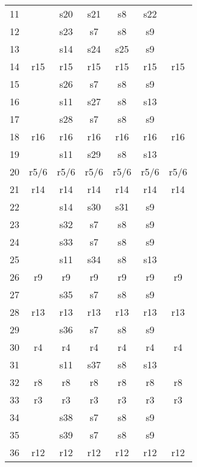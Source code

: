 \begin{figure}
\begin{minipage}{55mm}
\begin{tabular}{r@{\hspace{.6em}}c@{\hspace{.6em}}c*{4}{@{\hspace{1.2em}}c}}
        11 &        &   s20 &   s21 &    s8 &   s22 &      \\
        12 &        &   s23 &    s7 &    s8 &    s9 &      \\
        13 &        &   s14 &   s24 &   s25 &    s9 &      \\
        14 &    r15 &   r15 &   r15 &   r15 &   r15 &   r15\\
        15 &        &   s26 &    s7 &    s8 &    s9 &      \\
        16 &        &   s11 &   s27 &    s8 &   s13 &      \\
        17 &        &   s28 &    s7 &    s8 &    s9 &      \\
        18 &    r16 &   r16 &   r16 &   r16 &   r16 &   r16\\
        19 &        &   s11 &   s29 &    s8 &   s13 &      \\
        20 &   r5/6 &  r5/6 &  r5/6 &  r5/6 &  r5/6 &  r5/6\\
        21 &    r14 &   r14 &   r14 &   r14 &   r14 &   r14\\
        22 &        &   s14 &   s30 &   s31 &    s9 &      \\
        23 &        &   s32 &    s7 &    s8 &    s9 &      \\
        24 &        &   s33 &    s7 &    s8 &    s9 &      \\
        25 &        &   s11 &   s34 &    s8 &   s13 &      \\
        26 &     r9 &    r9 &    r9 &    r9 &    r9 &    r9\\
        27 &        &   s35 &    s7 &    s8 &    s9 &      \\
        28 &    r13 &   r13 &   r13 &   r13 &   r13 &   r13\\
        29 &        &   s36 &    s7 &    s8 &    s9 &      \\
        30 &     r4 &    r4 &    r4 &    r4 &    r4 &    r4\\
        31 &        &   s11 &   s37 &    s8 &   s13 &      \\
        32 &     r8 &    r8 &    r8 &    r8 &    r8 &    r8\\
        33 &     r3 &    r3 &    r3 &    r3 &    r3 &    r3\\
        34 &        &   s38 &    s7 &    s8 &    s9 &      \\
        35 &        &   s39 &    s7 &    s8 &    s9 &      \\
        36 &    r12 &   r12 &   r12 &   r12 &   r12 &   r12\\

\end{tabular}
\end{minipage}
\end{figure}
